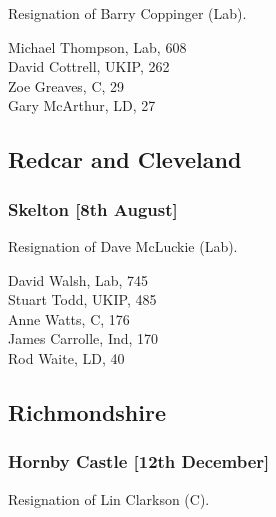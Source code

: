 \documentclass[a4paper,openany,10pt]{book}
\begin{document}

Resignation of Barry Coppinger (Lab).



Michael Thompson, Lab, 608\\
David Cottrell, UKIP, 262\\
Zoe Greaves, C, 29\\
Gary McArthur, LD, 27\\


\subsection*{Redcar and Cleveland}

\subsubsection*{Skelton \hspace*{\fill}\nolinebreak[1]%
\enspace\hspace*{\fill}
[8th August]}


Resignation of Dave McLuckie (Lab).



David Walsh, Lab, 745\\
Stuart Todd, UKIP, 485\\
Anne Watts, C, 176\\
James Carrolle, Ind, 170\\
Rod Waite, LD, 40\\


\subsection*{Richmondshire}

\subsubsection*{Hornby Castle \hspace*{\fill}\nolinebreak[1]%
\enspace\hspace*{\fill}
[12th December]}


Resignation of Lin Clarkson (C).
\end{document}

